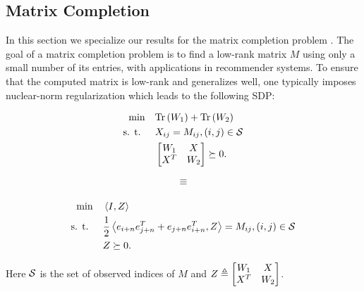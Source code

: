 \subsection{Matrix Completion}
In this section we specialize our results for the matrix completion problem \cite{candes2009exact}. The goal of a matrix completion problem is to find a low-rank matrix $M$ using only a small number of its entries, with applications in recommender systems. To ensure that the computed matrix is low-rank and generalizes well, one typically imposes nuclear-norm regularization which leads to the following SDP: 

\begin{minipage}{0.2\linewidth}
	\begin{align*}
	\min &\quad \mathrm{Tr}\left(W_1\right) + \mathrm{Tr}\left(W_2\right)\\ \text{s. t. }&\quad X_{ij} =M_{ij}, (i,j) \in \mathcal{S} \\  &\quad \begin{bmatrix}W_1 & X \\ X^T & W_2\end{bmatrix} \succeq 0.
	\end{align*}
\end{minipage}
\begin{minipage}{0.05\linewidth}
	\begin{align*}
		\equiv \\
	\end{align*} \break
\end{minipage}
\begin{minipage}{0.6\linewidth}
	\begin{align*}
	\min & \quad \left\langle I, Z \right\rangle \nonumber \\ \text{s. t. }&\quad \frac{1}{2}\left\langle e_{i+n}e_{j+n}^T + e_{j+n} e_{i+n}^T, Z \right\rangle = M_{ij}, (i,j) \in \mathcal{S} \nonumber \\  &\quad Z \succeq 0.
	\end{align*}
\end{minipage}
\noindent Here $\mathcal{S}$ is the set of observed indices of $M$ and $Z\triangleq \begin{bmatrix}W_1 & X \\ X^T & W_2\end{bmatrix}$. %

